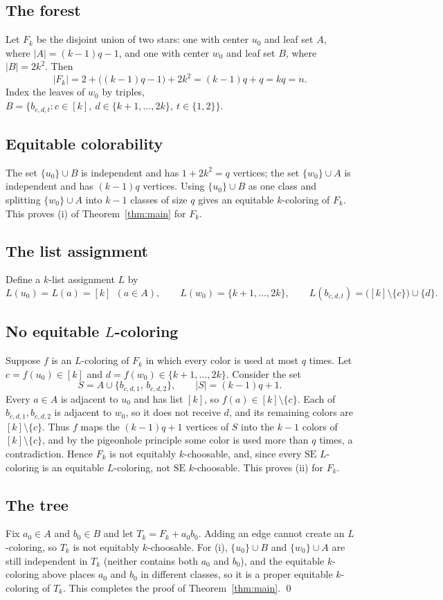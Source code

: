 \documentclass[11pt]{article}
\theoremstyle{definition}
\newcommand{\SE}{\mathrm{SE}}
\begin{document}
\subsection*{The forest}
Let $F_k$ be the disjoint union of two stars: one with center $u_0$ and leaf set $A$,
where $|A|=(k-1)q-1$, and one with center $w_0$ and leaf set $B$, where $|B|=2k^2$.
Then
\[
|F_k| = 2+\big((k-1)q-1\big)+2k^2 = (k-1)q+q = kq = n .
\]
Index the leaves of $w_0$ by triples,
$B=\{b_{c,d,t} : c\in[k],\ d\in\{k+1,\dots,2k\},\ t\in\{1,2\}\}$.

\subsection*{Equitable colorability}
The set $\{u_0\}\cup B$ is independent and has $1+2k^2=q$ vertices; the set
$\{w_0\}\cup A$ is independent and has $(k-1)q$ vertices. Using $\{u_0\}\cup B$ as one
class and splitting $\{w_0\}\cup A$ into $k-1$ classes of size $q$ gives an equitable
$k$-coloring of $F_k$. This proves (i) of Theorem~\ref{thm:main} for $F_k$.

\subsection*{The list assignment}
Define a $k$-list assignment $L$ by
\[
L(u_0)=L(a)=[k]\ \ (a\in A),\qquad
L(w_0)=\{k+1,\dots,2k\},\qquad
L(b_{c,d,t})=\big([k]\setminus\{c\}\big)\cup\{d\}.
\]

\subsection*{No equitable $L$-coloring}
Suppose $f$ is an $L$-coloring of $F_k$ in which every color is used at most $q$ times.
Let $c=f(u_0)\in[k]$ and $d=f(w_0)\in\{k+1,\dots,2k\}$. Consider the set
\[
S = A\cup\{b_{c,d,1},\,b_{c,d,2}\},\qquad |S|=(k-1)q+1 .
\]
Every $a\in A$ is adjacent to $u_0$ and has list $[k]$, so $f(a)\in[k]\setminus\{c\}$.
Each of $b_{c,d,1},b_{c,d,2}$ is adjacent to $w_0$, so it does not receive $d$, and its
remaining colors are $[k]\setminus\{c\}$. Thus $f$ maps the $(k-1)q+1$ vertices of $S$
into the $k-1$ colors of $[k]\setminus\{c\}$, and by the pigeonhole principle some color
is used more than $q$ times, a contradiction. Hence $F_k$ is not equitably $k$-choosable,
and, since every $\SE$ $L$-coloring is an equitable $L$-coloring, not $\SE$
$k$-choosable. This proves (ii) for $F_k$.

\subsection*{The tree}
Fix $a_0\in A$ and $b_0\in B$ and let $T_k=F_k+a_0b_0$. Adding an edge cannot create an
$L$-coloring, so $T_k$ is not equitably $k$-choosable. For (i), $\{u_0\}\cup B$ and
$\{w_0\}\cup A$ are still independent in $T_k$ (neither contains both $a_0$ and $b_0$), and
the equitable $k$-coloring above places $a_0$ and $b_0$ in different classes, so it is a
proper equitable $k$-coloring of $T_k$. This completes the proof of
Theorem~\ref{thm:main}. \qed
\end{document}
